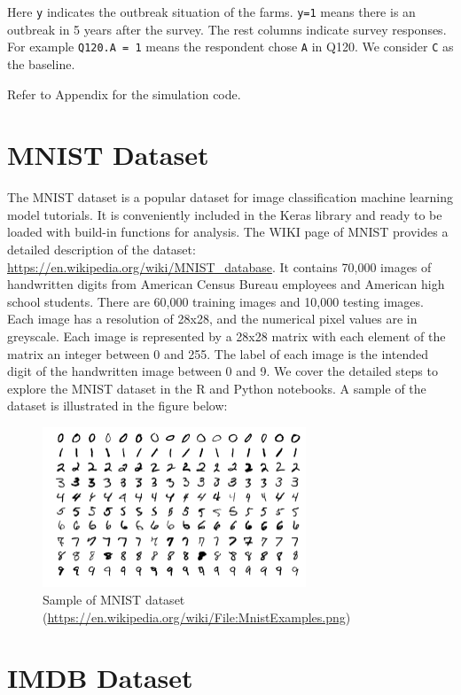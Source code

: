 \documentclass[12pt,]{krantz}
\begin{document}
Here \texttt{y} indicates the outbreak situation of the farms. \texttt{y=1} means there is an outbreak in 5 years after the survey. The rest columns indicate survey responses. For example \texttt{Q120.A\ =\ 1} means the respondent chose \texttt{A} in Q120. We consider \texttt{C} as the baseline.

Refer to Appendix for the simulation code.

\hypertarget{mnist-dataset}{%
\section{MNIST Dataset}\label{mnist-dataset}}

The MNIST dataset is a popular dataset for image classification machine learning model tutorials. It is conveniently included in the Keras library and ready to be loaded with build-in functions for analysis. The WIKI page of MNIST provides a detailed description of the dataset: \url{https://en.wikipedia.org/wiki/MNIST_database}. It contains 70,000 images of handwritten digits from American Census Bureau employees and American high school students. There are 60,000 training images and 10,000 testing images. Each image has a resolution of 28x28, and the numerical pixel values are in greyscale. Each image is represented by a 28x28 matrix with each element of the matrix an integer between 0 and 255. The label of each image is the intended digit of the handwritten image between 0 and 9. We cover the detailed steps to explore the MNIST dataset in the R and Python notebooks. A sample of the dataset is illustrated in the figure below:

\begin{figure}
\centering
\includegraphics[width=0.7\textwidth,height=\textheight]{images/MnistExamples.png}
\caption{Sample of MNIST dataset (\url{https://en.wikipedia.org/wiki/File:MnistExamples.png})}
\end{figure}

\hypertarget{imdb-dataset}{%
\section{IMDB Dataset}\label{imdb-dataset}}
\end{document}
